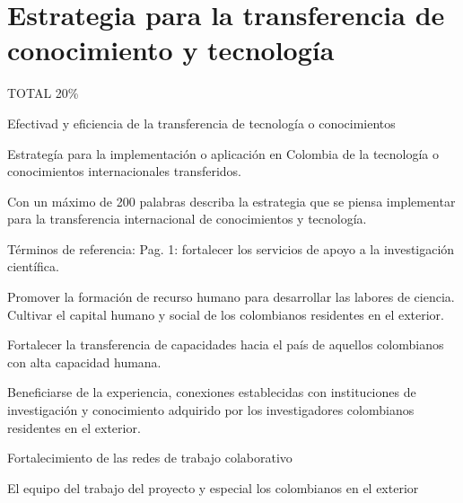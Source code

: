 \section{Estrategia para la transferencia de conocimiento y tecnología}
\begin{evaluacion}
  TOTAL 20\%

  Efectivad y eficiencia de la transferencia de tecnología o conocimientos 

  Estrategía para la implementación o aplicación en Colombia de la
  tecnología o conocimientos internacionales transferidos.
\end{evaluacion}

\begin{instrucciones}
Con un máximo de 200 palabras describa la estrategia que se piensa implementar para la transferencia internacional de conocimientos y tecnología.

  Términos de referencia:
  Pag. 1: fortalecer los servicios de apoyo a la investigación científica.

  Promover la formación de recurso humano para desarrollar las labores de ciencia. 
Cultivar el  capital humano y social de los colombianos residentes en el exterior.

Fortalecer la transferencia de capacidades hacia el país de aquellos colombianos con alta capacidad humana. 

Beneficiarse de la experiencia, conexiones establecidas con instituciones de investigación y conocimiento adquirido por los investigadores colombianos residentes en el exterior.

Fortalecimiento de las redes de trabajo colaborativo
\end{instrucciones}

El equipo del trabajo del proyecto y especial los colombianos en el exterior 

